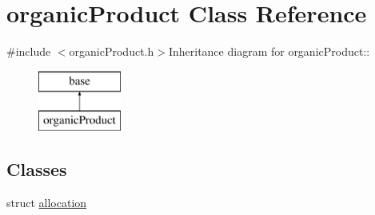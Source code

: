 \hypertarget{classorganic_product}{
\section{organicProduct Class Reference}
\label{classorganic_product}
}


{\ttfamily \#include $<$organicProduct.h$>$}Inheritance diagram for organicProduct::\begin{figure}[H]
\begin{center}
\leavevmode
\includegraphics[height=2cm]{classorganic_product}
\end{center}
\end{figure}
\subsection*{Classes}
\begin{DoxyCompactItemize}
\item 
struct \hyperlink{structorganic_product_1_1allocation}{allocation}
\end{DoxyCompactItemize}
